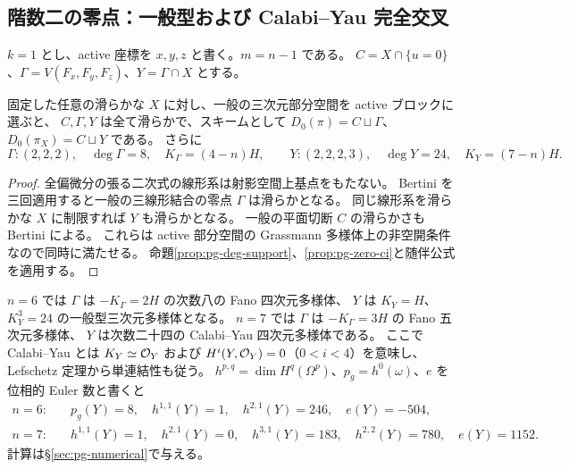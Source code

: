 \subsection{階数二の零点：一般型および Calabi--Yau 完全交叉}
$k=1$ とし、active 座標を $x,y,z$ と書く。$m=n-1$ である。
$C=X\cap\{u=0\}$、$\Gamma=V(F_x,F_y,F_z)$、$Y=\Gamma\cap X$ とする。
\begin{proposition}\label{prop:pg-rank2}
固定した任意の滑らかな $X$ に対し、一般の三次元部分空間を active ブロックに選ぶと、
$C,\Gamma,Y$ は全て滑らかで、スキームとして
$D_0(\pi)=C\sqcup\Gamma$、$D_0(\pi_X)=C\sqcup Y$ である。
さらに
\begin{equation}
\Gamma:(2,2,2),\quad\deg\Gamma=8,\quad K_\Gamma=(4-n)H,
\qquad
Y:(2,2,2,3),\quad\deg Y=24,\quad K_Y=(7-n)H.
\end{equation}
\end{proposition}
\begin{proof}
全偏微分の張る二次式の線形系は射影空間上基点をもたない。
Bertini を三回適用すると一般の三線形結合の零点 $\Gamma$ は滑らかとなる。
同じ線形系を滑らかな $X$ に制限すれば $Y$ も滑らかとなる。
一般の平面切断 $C$ の滑らかさも Bertini による。
これらは active 部分空間の Grassmann 多様体上の非空開条件なので同時に満たせる。
命題\ref{prop:pg-deg-support}、\ref{prop:pg-zero-ci}と随伴公式を適用する。
\end{proof}
$n=6$ では $\Gamma$ は $-K_\Gamma=2H$ の次数八の Fano 四次元多様体、
$Y$ は $K_Y=H$、$K_Y^3=24$ の一般型三次元多様体となる。
$n=7$ では $\Gamma$ は $-K_\Gamma=3H$ の Fano 五次元多様体、
$Y$ は次数二十四の Calabi--Yau 四次元多様体である。
ここで Calabi--Yau とは $K_Y\simeq\mathcal O_Y$ および $H^i(Y,\mathcal O_Y)=0$（$0<i<4$）を意味し、
Lefschetz 定理から単連結性も従う。
$h^{p,q}=\dim H^q(\Omega^p)$、$p_g=h^0(\omega)$、$e$ を位相的 Euler 数と書くと
\begin{equation}\begin{aligned}
n=6:&\quad p_g(Y)=8,\quad h^{1,1}(Y)=1,\quad h^{2,1}(Y)=246,\quad e(Y)=-504,\\
n=7:&\quad h^{1,1}(Y)=1,\quad h^{2,1}(Y)=0,\quad h^{3,1}(Y)=183,\quad h^{2,2}(Y)=780,\quad e(Y)=1152.
\end{aligned}\end{equation}
計算は\S\ref{sec:pg-numerical}で与える。

